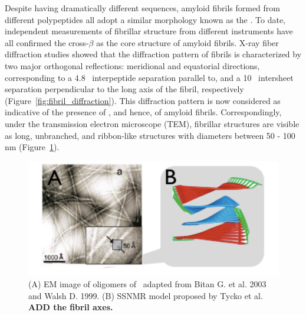 Despite having dramatically different sequences, amyloid fibrils formed from different polypeptides all adopt a similar morphology known as the \crossbs. To date, independent measurements of fibrillar structure from different instruments have all confirmed the cross-$\beta$ as the core structure of amyloid fibrils.  X-ray fiber diffraction studies showed that the diffraction pattern of fibrils is characterized by two major orthogonal reflections: meridional and equatorial directions,  corresponding to a 4.8 \angstrom\ interpeptide separation parallel to, and a 10 \angstrom\ intersheet separation perpendicular to the long axis of the fibril, respectively (Figure~\ref{fig:fibril_diffraction}).\cite{Sunde:1997cq,Makin:2005un,Sipe:2000fs} This diffraction pattern is now considered as indicative of the presence of \crossbs, and hence, of amyloid fibrils. Correspondingly, under the transmission electron microscope (TEM), fibrillar structures are visible as long, unbranched, and ribbon-like structures with diameters between 50 - 100 nm (Figure~\ref{fig:fibril_TEM_SSNMR}).\cite{Chiti:2006fz} 




\begin{figure}
 \centering
 \includegraphics[width=6in]{figures/introduction/fibril_TEM_SSNMR.pdf}
 \caption[Example EM images of non-fibrillar oligomers]{(A) EM image of oligomers of \ adapted from Bitan G. et al. 2003 and Walsh D. 1999. (B) SSNMR model proposed by Tycko et al. \textbf{ADD the fibril axes.}}
 \label{fig:fibril_TEM_SSNMR}
\end{figure}

